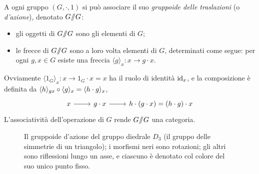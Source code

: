 \begin{example}\label{action_groupoid}
	A ogni gruppo \((G,\cdot,1)\) si può associare il suo \emph{gruppoide delle traslazioni} (o \emph{d'azione}), denotato \(G/\!\!/G\):
	\begin{itemize}
		\item gli oggetti di \(G/\!\!/G\) sono gli elementi di \(G\);
		\item le frecce di \(G/\!\!/G\) sono a loro volta elementi di \(G\), determinati come segue: per ogni \(g,x\in G\) esiste una freccia \(\langle g\rangle_x : x\to g\cdot x\).
	\end{itemize}
	Ovviamente \(\langle 1_G\rangle_x : x \to 1_G\cdot x=x\) ha il ruolo di identità \(\mathrm{id}_x\), e la composizione è definita da \(\langle h\rangle_{gx}\circ \langle g\rangle_x = \langle h\cdot g\rangle_x\),
	\[\begin{tikzcd}
			x \ar[r] & g\cdot x \ar[r] & h\cdot (g\cdot x) = (h\cdot g)\cdot x
		\end{tikzcd}\]
	L'associatività dell'operazione di \(G\) rende \(G/\!\!/G\) una categoria.
	\begin{figure}[h]
		\begin{center}
		\end{center}
		\caption{Il gruppoide d'azione del gruppo diedrale \(D_3\) (il gruppo delle simmetrie di un triangolo); i morfismi neri sono rotazioni; gli altri sono riflessioni lungo un asse, e ciascuno è denotato col colore del suo unico punto fisso.}
		\label{fig_gruppoide_d_azione}
	\end{figure}
\end{example}
